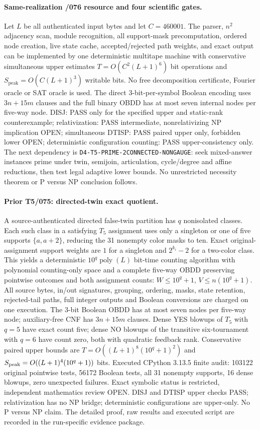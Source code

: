 \documentclass[11pt]{article}
\begin{document}
\paragraph{Same-realization /076 resource and four scientific gates.}
Let $L$ be all authenticated input bytes and let $C=460001$.
The parser, $n^2$ adjacency scan, module recognition, all support-mask
precomputation, ordered node creation, live state cache, accepted/rejected
path weights, and exact output can be implemented by one deterministic
multitape machine with conservative simultaneous upper estimates
$T=O(C^2(L+1)^6)$ bit operations and
$S_{\mathrm{peak}}=O(C(L+1)^3)$ writable bits. No free decomposition
certificate, Fourier oracle or SAT oracle is used. The direct
$3$-bit-per-symbol Boolean encoding uses $3n+15m$ clauses and
the full binary OBDD has at most seven internal nodes per five-way node.
DISJ: PASS only for the specified upper and static-rank counterexample;
relativization: PASS intermediate, nonrelativizing NP implication OPEN;
simultaneous DTISP: PASS paired upper only, forbidden lower OPEN;
deterministic configuration counting: PASS upper-consistency only.
The next dependency is
\texttt{D4-T5-PRIME-2CONNECTED-NONGAUGE}:
seek mixed-answer instances prime under twin, semijoin, articulation,
cycle/degree and affine reductions, then test legal adaptive lower bounds.
No unrestricted necessity theorem or P versus NP conclusion follows.


\paragraph{Prior T5/075: directed-twin exact quotient.}
A source-authenticated directed false-twin partition has $q$ nonisolated
classes. Each such class in a satisfying $T_5$ assignment uses only a
singleton or one of five supports $\{a,a+2\}$, reducing the 31 nonempty
color masks to ten. Exact original-assignment support weights are
$1$ for a singleton and $2^{k_i}-2$ for a two-color class.
This yields a deterministic $10^q\operatorname{poly}(L)$ bit-time
counting algorithm with polynomial counting-only space and a complete
five-way OBDD preserving pointwise outcomes and both assignment counts:
$W\le10^q+1$, $V\le n(10^q+1)$. All source bytes, in/out signatures,
grouping, ordering, masks, state retention, rejected-tail paths, full
integer outputs and Boolean conversions are charged on one execution.
The $3$-bit Boolean OBDD has at most seven nodes per five-way node;
auxiliary-free CNF has $3n+15m$ clauses.
Dense YES blowups of $T_5$ with $q=5$ have exact count five; dense NO
blowups of the transitive six-tournament with $q=6$ have count zero,
both with quadratic feedback rank. Conservative paired upper bounds
are $T=O((L+1)^8(10^q+1)^2)$ and
$S_{\rm peak}=O((L+1)^4(10^q+1))$ bits.
Executed CPython 3.13.5 finite audit: 103122 original pointwise tests,
56172 Boolean tests, all 31 nonempty supports, 16 dense blowups,
zero unexpected failures. Exact symbolic status is restricted,
independent mathematics review OPEN. DISJ and DTISP upper checks PASS;
relativization has no NP bridge; deterministic configurations are
upper-only. No P versus NP claim. The detailed proof, raw results and
executed script are recorded in the run-specific evidence package.
\end{document}
